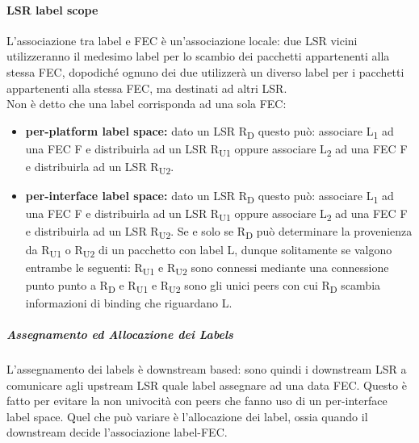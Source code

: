 \documentclass{article}
\begin{document}
\paragraph{LSR label scope} L'associazione tra label e FEC è un'associazione locale: due LSR vicini utilizzeranno il medesimo label per lo scambio dei pacchetti appartenenti alla stessa FEC, dopodiché ognuno dei due utilizzerà un diverso label per i pacchetti appartenenti alla stessa FEC, ma destinati ad altri LSR. \\ Non è detto che una label corrisponda ad una sola FEC:
\begin{itemize}
    \item \textbf{per-platform label space:} dato un LSR  R\textsubscript{D} questo può: associare L\textsubscript{1} ad una FEC F e distribuirla ad un LSR R\textsubscript{U1} oppure associare L\textsubscript{2} ad una FEC F e distribuirla ad un LSR R\textsubscript{U2}.
    \item \textbf{per-interface label space:} dato un LSR  R\textsubscript{D} questo può: associare L\textsubscript{1} ad una FEC F e distribuirla ad un LSR R\textsubscript{U1} oppure associare L\textsubscript{2} ad una FEC F e distribuirla ad un LSR R\textsubscript{U2}. Se e solo se R\textsubscript{D} può determinare la provenienza da R\textsubscript{U1} o R\textsubscript{U2} di un pacchetto con label L, dunque solitamente se valgono entrambe le seguenti: R\textsubscript{U1} e R\textsubscript{U2} sono connessi mediante una connessione punto punto a R\textsubscript{D} e R\textsubscript{U1} e R\textsubscript{U2} sono gli unici peers con cui R\textsubscript{D} scambia informazioni di binding che riguardano L.
\end{itemize}

\subparagraph{Assegnamento ed Allocazione dei Labels} L'assegnamento dei labels è downstream based: sono quindi i downstream LSR a comunicare agli upstream LSR quale label assegnare ad una data FEC. Questo è fatto per evitare la non univocità con peers che fanno uso di un per-interface label space. Quel che può variare è l'allocazione dei label, ossia quando il downstream decide l'associazione label-FEC.
\end{document}
